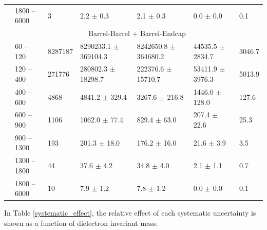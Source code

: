 \begin{table}[htp]
\begin{center}
{\begin{tabular}{|l|l|l|l|l|l|l|}
& 1800  -- 6000  & 3              & 2.2        $\pm$ 0.3        & 2.1        $\pm$ 0.3              & 0.0        $\pm$ 0.0              & 0.1        \\  \cline{2-7}
&\multicolumn{6}{c|}{Barrel-Barrel + Barrel-Endcap} \\ \cline{2-7}
& 60    -- 120   & 8287187        & 8290233.1  $\pm$ 369104.3   & 8242650.8  $\pm$ 364680.2         & 44535.5    $\pm$ 2834.7           & 3046.7    \\
& 120   -- 400   & 271776         & 280802.3   $\pm$ 18298.7    & 222376.6   $\pm$ 15710.7          & 53411.9    $\pm$ 3976.3           & 5013.9    \\
& 400   -- 600   & 4868           & 4841.2     $\pm$ 329.4      & 3267.6     $\pm$ 216.8            & 1446.0     $\pm$ 128.0            & 127.6     \\
& 600   -- 900   & 1106           & 1062.0     $\pm$ 77.4       & 829.4      $\pm$ 63.0             & 207.4      $\pm$ 22.6             & 25.3      \\
& 900   -- 1300  & 193            & 201.3      $\pm$ 18.0       & 176.2      $\pm$ 16.0             & 21.6       $\pm$ 3.9              & 3.5       \\
& 1300  -- 1800  & 44             & 37.6       $\pm$ 4.2        & 34.8       $\pm$ 4.0              & 2.1        $\pm$ 1.1              & 0.7       \\
& 1800  -- 6000  & 10             & 7.9        $\pm$ 1.2        & 7.8        $\pm$ 1.2              & 0.0        $\pm$ 0.0              & 0.1       \\  \hline

\end{tabular}}
\end{center}
\end{table}




In Table \ref{systematic_effect}, the relative effect of each systematic uncertainty is shown as a function of dielectron invariant mass.

